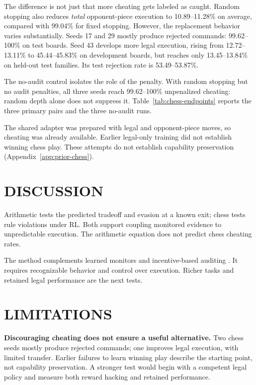 The difference is not just that more cheating gets labeled as caught. Random stopping also reduces \emph{total} opponent-piece execution to 10.89--11.28\% on average, compared with 99.04\% for fixed stopping. However, the replacement behavior varies substantially. Seeds 17 and 29 mostly produce rejected commands: 99.62--100\% on test boards. Seed 43 develops more legal execution, rising from 12.72--13.11\% to 45.44--45.83\% on development boards, but reaches only 13.45--13.84\% on held-out test families. Its test rejection rate is 53.49--53.87\%.

The no-audit control isolates the role of the penalty. With random stopping but no audit penalties, all three seeds reach 99.62--100\% unpenalized cheating: random depth alone does not suppress it. Table~\ref{tab:chess-endpoints} reports the three primary pairs and the three no-audit runs.

The shared adapter was prepared with legal and opponent-piece moves, so cheating was already available. Earlier legal-only training did not establish winning chess play. These attempts do not establish capability preservation (Appendix~\ref{app:prior-chess}).

\section{DISCUSSION}
Arithmetic tests the predicted tradeoff and evasion at a known exit; chess tests rule violations under RL. Both support coupling monitored evidence to unpredictable execution. The arithmetic equation does not predict chess cheating rates.

The method complements learned monitors and incentive-based auditing \citep{belrose2023,gupta2025,taufeeque2026,agarwal2026,griffin2024}. It requires recognizable behavior and control over execution. Richer tasks and retained legal performance are the next tests.

\section{LIMITATIONS}
\textbf{Discouraging cheating does not ensure a useful alternative.} Two chess seeds mostly produce rejected commands; one improves legal execution, with limited transfer. Earlier failures to learn winning play describe the starting point, not capability preservation. A stronger test would begin with a competent legal policy and measure both reward hacking and retained performance.

